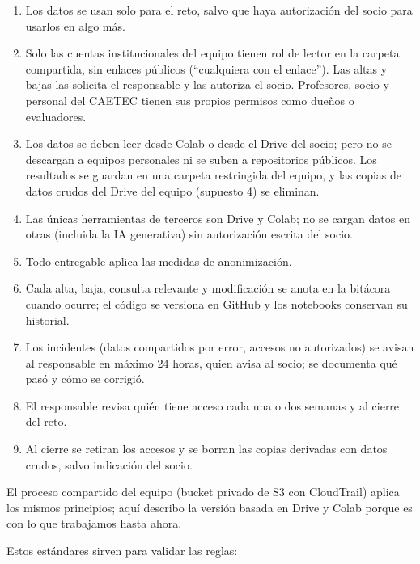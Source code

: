 
\begin{enumerate}
  \item Los datos se usan solo para el reto, salvo que haya autorización del socio para usarlos en algo más.
  \item Solo las cuentas institucionales del equipo tienen rol de lector en la carpeta compartida, sin enlaces públicos (“cualquiera con el enlace”). Las altas y bajas las solicita el responsable y las autoriza el socio. Profesores, socio y personal del CAETEC tienen sus propios permisos como dueños o evaluadores.
  \item Los datos se deben leer desde Colab o desde el Drive del socio; pero no se descargan a equipos personales ni se suben a repositorios públicos. Los resultados se guardan en una carpeta restringida del equipo, y las copias de datos crudos del Drive del equipo (supuesto 4) se eliminan.
  \item Las únicas herramientas de terceros son Drive y Colab; no se cargan datos en otras (incluida la IA generativa) sin autorización escrita del socio.
  \item Todo entregable aplica las medidas de anonimización.
  \item Cada alta, baja, consulta relevante y modificación se anota en la bitácora cuando ocurre; el código se versiona en GitHub y los notebooks conservan su historial.
  \item Los incidentes (datos compartidos por error, accesos no autorizados) se avisan al responsable en máximo 24 horas, quien avisa al socio; se documenta qué pasó y cómo se corrigió.
  \item El responsable revisa quién tiene acceso cada una o dos semanas y al cierre del reto.
  \item Al cierre se retiran los accesos y se borran las copias derivadas con datos crudos, salvo indicación del socio.
\end{enumerate}

El proceso compartido del equipo (bucket privado de S3 con CloudTrail) aplica los mismos principios; aquí describo la versión basada en Drive y Colab porque es con lo que trabajamos hasta ahora.

Estos estándares sirven para validar las reglas:

